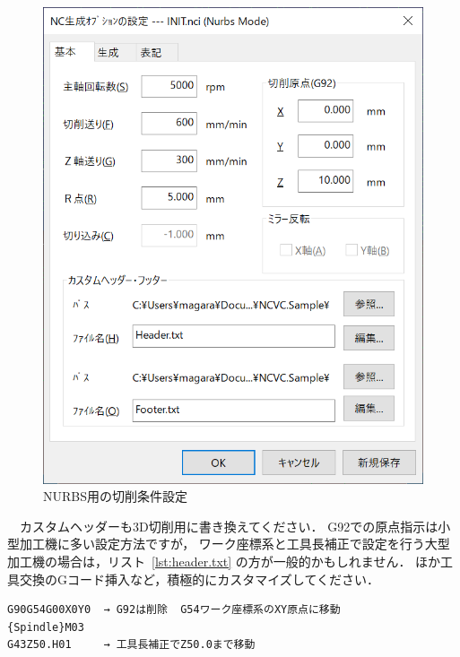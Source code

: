 \begin{minipage}{0.5\textwidth}
\begin{figure}[H]
\centering
\includegraphics[scale=0.7]{No2/fig/fig27.png}
\caption{NURBS用の切削条件設定}
\label{fig:ncvc27}
\end{figure}
\end{minipage}

\vspace*{2zh}
　カスタムヘッダーも3D切削用に書き換えてください．
G92での原点指示は小型加工機に多い設定方法ですが，
ワーク座標系と工具長補正で設定を行う大型加工機の場合は，リスト~\ref{lst:header.txt} の方が一般的かもしれません．
ほか工具交換のGコード挿入など，積極的にカスタマイズしてください．

\begin{lstlisting}[caption=カスタムヘッダーの例,numbers=none,label=lst:header.txt]
%
G90G54G00X0Y0  → G92は削除  G54ワーク座標系のXY原点に移動
{Spindle}M03
G43Z50.H01     → 工具長補正でZ50.0まで移動
\end{lstlisting}

